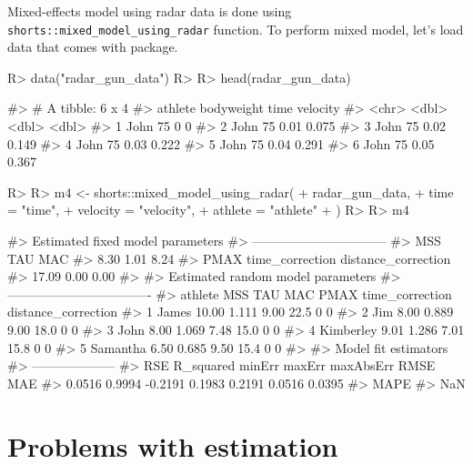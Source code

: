 \documentclass[
]{jss}
\begin{document}
Mixed-effects model using radar data is done using \texttt{shorts::mixed\_model\_using\_radar} function. To perform mixed model, let's load data that comes with  package.

\begin{CodeChunk}
\begin{CodeInput}
R> data("radar_gun_data")
R> 
R> head(radar_gun_data)
\end{CodeInput}
\begin{CodeOutput}
#> # A tibble: 6 x 4
#>   athlete bodyweight  time velocity
#>   <chr>        <dbl> <dbl>    <dbl>
#> 1 John            75  0       0    
#> 2 John            75  0.01    0.075
#> 3 John            75  0.02    0.149
#> 4 John            75  0.03    0.222
#> 5 John            75  0.04    0.291
#> 6 John            75  0.05    0.367
\end{CodeOutput}
\begin{CodeInput}
R> 
R> m4 <- shorts::mixed_model_using_radar(
+   radar_gun_data,
+   time = "time",
+   velocity = "velocity",
+   athlete = "athlete"
+ )
R> 
R> m4
\end{CodeInput}
\begin{CodeOutput}
#> Estimated fixed model parameters
#> --------------------------------
#>                 MSS                 TAU                 MAC 
#>                8.30                1.01                8.24 
#>                PMAX     time_correction distance_correction 
#>               17.09                0.00                0.00 
#> 
#> Estimated random model parameters
#> ----------------------------------
#>     athlete   MSS   TAU  MAC PMAX time_correction distance_correction
#> 1     James 10.00 1.111 9.00 22.5               0                   0
#> 2       Jim  8.00 0.889 9.00 18.0               0                   0
#> 3      John  8.00 1.069 7.48 15.0               0                   0
#> 4 Kimberley  9.01 1.286 7.01 15.8               0                   0
#> 5  Samantha  6.50 0.685 9.50 15.4               0                   0
#> 
#> Model fit estimators
#> --------------------
#>       RSE R_squared    minErr    maxErr maxAbsErr      RMSE       MAE 
#>    0.0516    0.9994   -0.2191    0.1983    0.2191    0.0516    0.0395 
#>      MAPE 
#>       NaN
\end{CodeOutput}
\end{CodeChunk}

\hypertarget{problems-with-estimation}{%
\section{Problems with estimation}\label{problems-with-estimation}}
\end{document}
